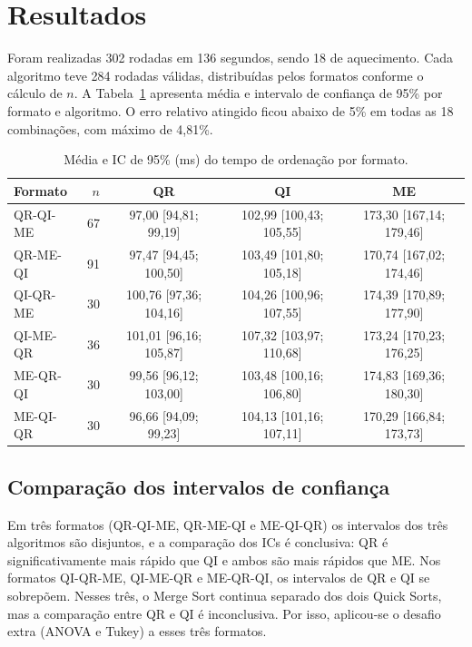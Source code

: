 \documentclass[12pt]{article}
\begin{document}
\section{Resultados}

Foram realizadas 302 rodadas em 136 segundos, sendo 18 de aquecimento. Cada
algoritmo teve 284 rodadas válidas, distribuídas pelos formatos conforme o
cálculo de $n$. A Tabela~\ref{tab:medias} apresenta média e intervalo de
confiança de 95\% por formato e algoritmo. O erro relativo atingido ficou
abaixo de 5\% em todas as 18 combinações, com máximo de 4,81\%.

\begin{table}[ht]
\centering
\caption{Média e IC de 95\% (ms) do tempo de ordenação por formato.}
\label{tab:medias}
\footnotesize
\begin{tabular}{lrccc}
\toprule
Formato & $n$ & QR & QI & ME \\
\midrule
QR-QI-ME & 67 & 97,00 [94,81; 99,19] & 102,99 [100,43; 105,55] & 173,30 [167,14; 179,46] \\
QR-ME-QI & 91 & 97,47 [94,45; 100,50] & 103,49 [101,80; 105,18] & 170,74 [167,02; 174,46] \\
QI-QR-ME & 30 & 100,76 [97,36; 104,16] & 104,26 [100,96; 107,55] & 174,39 [170,89; 177,90] \\
QI-ME-QR & 36 & 101,01 [96,16; 105,87] & 107,32 [103,97; 110,68] & 173,24 [170,23; 176,25] \\
ME-QR-QI & 30 & 99,56 [96,12; 103,00] & 103,48 [100,16; 106,80] & 174,83 [169,36; 180,30] \\
ME-QI-QR & 30 & 96,66 [94,09; 99,23] & 104,13 [101,16; 107,11] & 170,29 [166,84; 173,73] \\
\bottomrule
\end{tabular}
\end{table}

\subsection{Comparação dos intervalos de confiança}

Em três formatos (QR-QI-ME, QR-ME-QI e ME-QI-QR) os intervalos dos três
algoritmos são disjuntos, e a comparação dos ICs é conclusiva: QR é
significativamente mais rápido que QI e ambos são mais rápidos que ME. Nos
formatos QI-QR-ME, QI-ME-QR e ME-QR-QI, os intervalos de QR e QI se sobrepõem.
Nesses três, o Merge Sort continua separado dos dois Quick Sorts, mas a
comparação entre QR e QI é inconclusiva. Por isso, aplicou-se o desafio extra
(ANOVA e Tukey) a esses três formatos.
\end{document}
